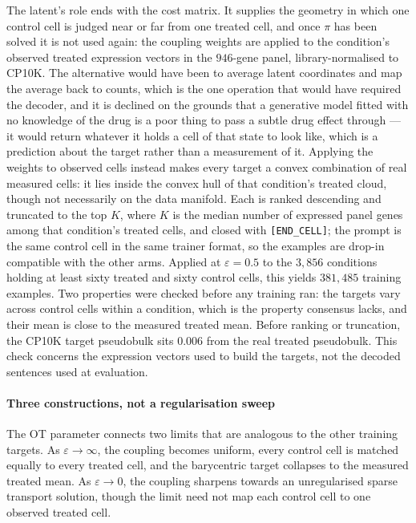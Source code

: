 The latent's role ends with the cost matrix. It supplies the geometry in which one
control cell is judged near or far from one treated cell, and once $\pi$ has been
solved it is not used again: the coupling weights are applied to the condition's
observed treated expression vectors in the $946$-gene panel, library-normalised to
CP10K. The alternative would have been to average latent coordinates and map the
average back to counts, which is the one operation that would have required the
decoder, and it is declined on the grounds that a generative model fitted with no
knowledge of the drug is a poor thing to pass a subtle drug effect through --- it
would return whatever it holds a cell of that state to look like, which is a
prediction about the target rather than a measurement of it. Applying the weights
to observed cells instead makes every target a convex combination of real measured
cells: it lies inside the convex hull of that condition's treated cloud, though not
necessarily on the data manifold. Each is ranked descending and truncated to the
top $K$, where $K$ is the median number of expressed panel genes among that
condition's treated cells, and closed with \texttt{[END\_CELL]}; the prompt is the
same control cell in the same trainer format, so the examples are drop-in
compatible with the other arms. Applied at $\varepsilon = 0.5$ to the $3{,}856$
conditions holding at least sixty treated and sixty control cells, this yields
$381{,}485$ training examples. Two properties were checked before any training ran:
the targets vary across control cells within a condition, which is the property
consensus lacks, and their mean is close to the measured treated mean. Before
ranking or truncation, the CP10K target pseudobulk sits $0.006$ from the real
treated pseudobulk. This check concerns the expression vectors used to build the
targets, not the decoded sentences used at evaluation.

\paragraph{Three constructions, not a regularisation sweep} The OT parameter
connects two limits that are analogous to the other training targets. As
$\varepsilon\rightarrow\infty$, the coupling becomes uniform, every control
cell is matched equally to every treated cell, and the barycentric target
collapses to the measured treated mean. As $\varepsilon\rightarrow 0$, the
coupling sharpens towards an unregularised sparse transport solution, though
the limit need not map each control cell to one observed treated cell.

